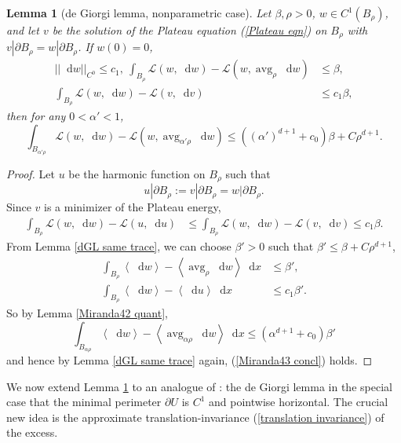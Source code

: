 \documentclass[reqno,10pt]{amsart}
\DeclareMathOperator{\avg}{avg}
\newcommand*\dif{\mathop{}\!\mathrm{d}}
\newcommand{\Lagrange}{\mathscr L}
\def\Japan#1{\left \langle #1 \right \rangle}
\newtheorem{lemma}[theorem]{Lemma}
\theoremstyle{definition}
\numberwithin{equation}{section}
\begin{document}
\begin{lemma}[de Giorgi lemma, nonparametric case]\label{Miranda43}
Let $\beta, \rho > 0$, $w \in C^1(B_\rho)$, and let $v$ be the solution of the Plateau equation (\ref{Plateau eqn}) on $B_\rho$ with $v|\partial B_\rho = w|\partial B_\rho$.
If $w(0) = 0$,
\begin{align}
||\dif w||_{C^0} \leq c_1, ~\int_{B_\rho} \Lagrange(w, \dif w) - \Lagrange(w, \avg_\rho \dif w) &\leq \beta \label{Miranda43 oscillation}, \\
\int_{B_\rho} \Lagrange(w, \dif w) - \Lagrange(v, \dif v) &\leq c_1 \beta \label{Miranda43 minimality},
\end{align}
then for any $0 < \alpha' < 1$,
\begin{equation}\label{Miranda43 concl}
\int_{B_{\alpha' \rho}} \Lagrange(w, \dif w) - \Lagrange(w, \avg_{\alpha' \rho} \dif w) \leq ((\alpha')^{d + 1} + c_0) \beta + C\rho^{d + 1}.
\end{equation}
\end{lemma}
\begin{proof}
Let $u$ be the harmonic function on $B_\rho$ such that 
$$u|\partial B_\rho := v|\partial B_\rho = w|\partial B_\rho.$$
Since $v$ is a minimizer of the Plateau energy,
\begin{align*}
\int_{B_\rho} \Lagrange(w, \dif w) - \Lagrange(u, \dif u) &\leq \int_{B_\rho} \Lagrange(w, \dif w) - \Lagrange(v, \dif v) \leq c_1 \beta.
\end{align*}
From Lemma \ref{dGL same trace}, we can choose $\beta' > 0$ such that $\beta' \leq \beta + C\rho^{d + 1}$,
\begin{align*}
\int_{B_\rho} \Japan{\dif w} - \Japan{\avg_\rho \dif w} \dif x &\leq \beta', \\
\int_{B_\rho} \Japan{\dif w} - \Japan{\dif u} \dif x &\leq c_1 \beta'.
\end{align*}
So by Lemma \ref{Miranda42 quant},
$$\int_{B_{\alpha \rho}} \Japan{\dif w} - \Japan{\avg_{\alpha \rho} \dif w} \dif x \leq (\alpha^{d + 1} + c_0) \beta'$$
and hence by Lemma \ref{dGL same trace} again, (\ref{Miranda43 concl}) holds.
\end{proof}

We now extend Lemma \ref{Miranda43} to an analogue of \cite[Teorema 4.4]{Miranda66}: the de Giorgi lemma in the special case that the minimal perimeter $\partial U$ is $C^1$ and pointwise horizontal.
The crucial new idea is the approximate translation-invariance (\ref{translation invariance}) of the excess.
\end{document}
